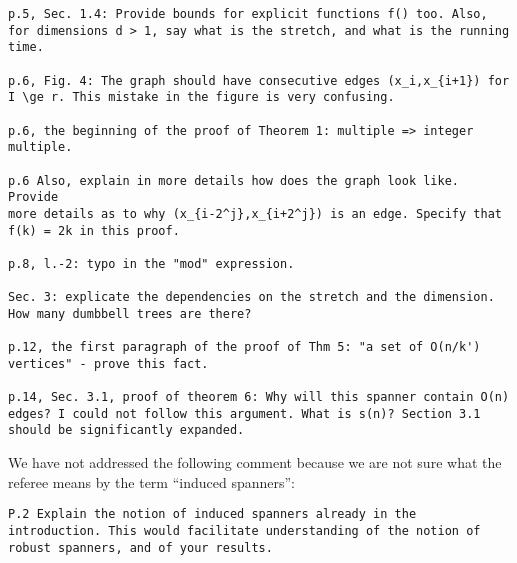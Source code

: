 \documentclass{patmorin}
\begin{document}
\begin{Verbatim}[frame=single]
p.5, Sec. 1.4: Provide bounds for explicit functions f() too. Also,
for dimensions d > 1, say what is the stretch, and what is the running
time.

p.6, Fig. 4: The graph should have consecutive edges (x_i,x_{i+1}) for
I \ge r. This mistake in the figure is very confusing.

p.6, the beginning of the proof of Theorem 1: multiple => integer
multiple.

p.6 Also, explain in more details how does the graph look like. Provide
more details as to why (x_{i-2^j},x_{i+2^j}) is an edge. Specify that
f(k) = 2k in this proof.

p.8, l.-2: typo in the "mod" expression.

Sec. 3: explicate the dependencies on the stretch and the dimension.
How many dumbbell trees are there?

p.12, the first paragraph of the proof of Thm 5: "a set of O(n/k')
vertices" - prove this fact.

p.14, Sec. 3.1, proof of theorem 6: Why will this spanner contain O(n)
edges? I could not follow this argument. What is s(n)? Section 3.1
should be significantly expanded.
\end{Verbatim}

We have not addressed the following comment because we are not sure what the referee means by the term ``induced spanners'':

\begin{Verbatim}[frame=single]
P.2 Explain the notion of induced spanners already in the
introduction. This would facilitate understanding of the notion of
robust spanners, and of your results.
\end{Verbatim}
\end{document}
